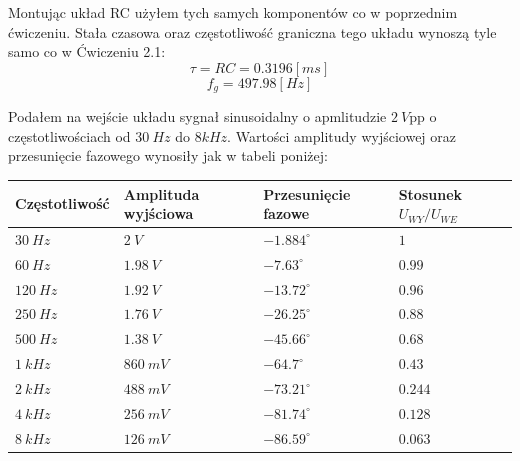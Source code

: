 \documentclass[14pt, table]{extarticle}
\begin{document}
\begin{figure}[H]
    \centering
    \qquad
\end{figure}

Montując układ RC użyłem tych samych komponentów co w poprzednim ćwiczeniu. Stała czasowa oraz częstotliwość graniczna tego układu wynoszą tyle samo co w Ćwiczeniu 2.1:
$$ \tau = RC = 0.3196  \left[ ms \right] $$
$$ f_g = 497.98  \left[ Hz \right] $$

Podałem na wejście układu sygnał sinusoidalny o apmlitudzie $2 \ V$pp o częstotliwościach od $30 \ Hz$ do $8 kHz$. Wartości amplitudy wyjściowej oraz przesunięcie fazowego wynosiły jak w tabeli poniżej: \\

\begin{tabular}{ | m{4cm} | m{4cm}| m{4cm} | m{3.5cm} | } 
  \hline
  \textbf{Częstotliwość} & \textbf{Amplituda wyjściowa} & \textbf{Przesunięcie fazowe} & \textbf{Stosunek } $U_{WY} / U_{WE}$ \\ 
  \hline
  $30 \ Hz$ & $2 \ V$ & $-1.884^{\circ}$ & $1$ \\
  \hline
  $60 \ Hz$ & $1.98 \ V$ & $-7.63^{\circ}$ & $0.99$ \\
  \hline
  $120 \ Hz$ & $1.92 \ V$ & $-13.72^{\circ}$ & $0.96$ \\
  \hline
  $250 \ Hz$ & $1.76 \ V$ & $-26.25^{\circ}$ & $0.88$ \\
  \hline
  $500 \ Hz$ & $1.38 \ V$ & $-45.66^{\circ}$ & $0.68$ \\
  \hline
  $1 \ kHz$ & $860 \ mV$ & $-64.7^{\circ}$ & $0.43$ \\
  \hline
  $2 \ kHz$ & $488 \ mV$ & $-73.21^{\circ}$ & $0.244$ \\
  \hline
  $4 \ kHz$ & $256 \ mV$ & $-81.74^{\circ}$ & $0.128$ \\
  \hline
  $8 \ kHz$ & $126 \ mV$ & $-86.59^{\circ}$ &  $0.063$ \\
  \hline
\end{tabular}
\end{document}
